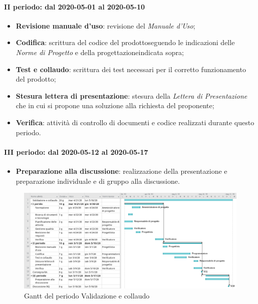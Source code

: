\paragraph*{II periodo: dal 2020-05-01 al 2020-05-10}
\begin{itemize}
	\item \textbf{Revisione manuale d'uso}: revisione del \textit{Manuale d'Uso};
	\item \textbf{Codifica}: scrittura del codice del prodotto\glosp seguendo le indicazioni delle \textit{Norme di Progetto} e della progettazione\glosp indicata sopra;
	\item \textbf{Test e collaudo}: scrittura dei test necessari per il corretto funzionamento del prodotto\glo;
	\item \textbf{Stesura lettera di presentazione}: stesura della \textit{Lettera di Presentazione} che in cui si propone una soluzione alla richiesta del proponente;
	\item \textbf{Verifica}: attività di controllo di documenti e codice realizzati durante questo periodo.
\end{itemize}

\paragraph*{III periodo: dal 2020-05-12 al 2020-05-17}
\begin{itemize}
	\item \textbf{Preparazione alla discussione}: realizzazione della presentazione e preparazione individuale e di gruppo alla discussione.
\end{itemize}
\begin{landscape}
	\begin{figure}[H] 	
		\includegraphics[width=\linewidth]{./gantt/Validazione e collaudo.png}	
		\caption{Gantt del periodo Validazione e collaudo}	
	\end{figure}
\end{landscape}
